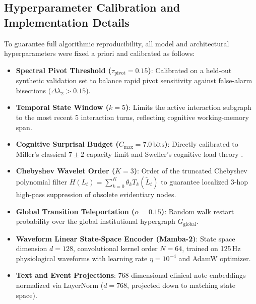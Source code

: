 \documentclass[ijds,dblanonrev]{informs4}
\begin{document}
\subsection{Hyperparameter Calibration and Implementation Details}
To guarantee full algorithmic reproducibility, all model and architectural hyperparameters were fixed a priori and calibrated as follows:
\begin{itemize}\setlength{\itemsep}{2pt}\setlength{\parskip}{0pt}
  \item \textbf{Spectral Pivot Threshold ($\tau_{\text{pivot}} = 0.15$)}: Calibrated on a held-out synthetic validation set to balance rapid pivot sensitivity against false-alarm bisections ($\Delta \lambda_2 > 0.15$).
  \item \textbf{Temporal State Window ($k = 5$)}: Limits the active interaction subgraph to the most recent 5 interaction turns, reflecting cognitive working-memory span.
  \item \textbf{Cognitive Surprisal Budget ($C_{\max} = 7.0\,\text{bits}$)}: Directly calibrated to Miller's classical $7 \pm 2$ capacity limit \citep{miller1956magical} and Sweller's cognitive load theory \citep{sweller1988cognitive}.
  \item \textbf{Chebyshev Wavelet Order ($K = 3$)}: Order of the truncated Chebyshev polynomial filter $H(L_t) = \sum_{k=0}^K \theta_k T_k(\tilde{L}_t)$ to guarantee localized 3-hop high-pass suppression of obsolete evidentiary nodes.
  \item \textbf{Global Transition Teleportation ($\alpha = 0.15$)}: Random walk restart probability over the global institutional hypergraph $G_{\text{global}}$.
  \item \textbf{Waveform Linear State-Space Encoder (Mamba-2)}: State space dimension $d = 128$, convolutional kernel order $N = 64$, trained on 125\,Hz physiological waveforms with learning rate $\eta = 10^{-4}$ and AdamW optimizer.
  \item \textbf{Text and Event Projections}: 768-dimensional clinical note embeddings normalized via LayerNorm ($d = 768$, projected down to matching state space).
\end{itemize}
\end{document}
